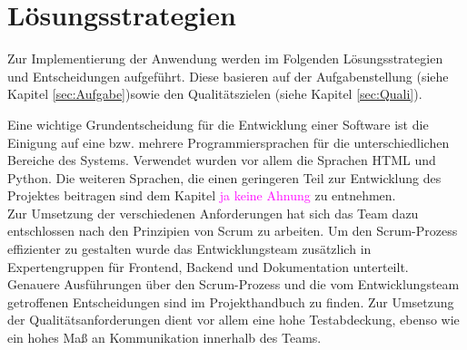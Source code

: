 \chapter{Lösungsstrategien}
Zur Implementierung der Anwendung werden im Folgenden Lösungsstrategien und Entscheidungen aufgeführt. Diese basieren auf der Aufgabenstellung (siehe Kapitel \ref{sec:Aufgabe})sowie den Qualitätszielen (siehe Kapitel \ref{sec:Quali}).

Eine wichtige Grundentscheidung für die Entwicklung einer Software ist die Einigung auf eine bzw. mehrere Programmiersprachen für die unterschiedlichen Bereiche des Systems. Verwendet wurden vor allem die Sprachen HTML und Python. Die weiteren Sprachen, die einen geringeren Teil zur Entwicklung des Projektes beitragen sind dem Kapitel \textcolor{magenta}{ja keine Ahnung} zu entnehmen. \\
Zur Umsetzung der verschiedenen Anforderungen hat sich das Team dazu entschlossen nach den Prinzipien von Scrum zu arbeiten. Um den Scrum-Prozess effizienter zu gestalten wurde das Entwicklungsteam zusätzlich in Expertengruppen für \gls{Frontend}, \gls{Backend} und Dokumentation unterteilt. Genauere Ausführungen über den Scrum-Prozess und die vom Entwicklungsteam getroffenen Entscheidungen sind im Projekthandbuch zu finden.
Zur Umsetzung der Qualitätsanforderungen dient vor allem eine hohe Testabdeckung, ebenso wie ein hohes Maß an Kommunikation innerhalb des Teams.
